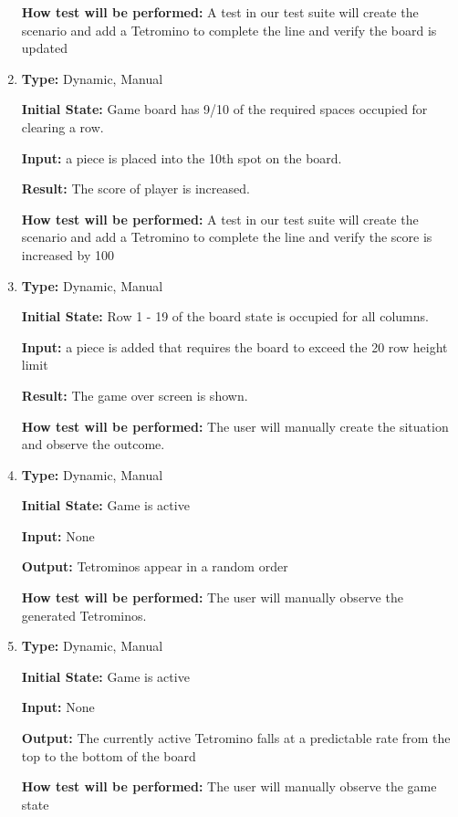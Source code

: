 \documentclass[12pt, titlepage]{article}
\begin{document}
\begin{enumerate}[{FR-BI-}1. ]
		\textbf{How test will be performed:} A test in our test suite will create the scenario and add a Tetromino to complete the line and verify the board is updated
		
		\item
		\textbf{Type:} Dynamic, Manual
		
		\textbf{Initial State:} Game board has 9/10 of the required spaces occupied for clearing a row.
		
		\textbf{Input:} a piece is placed into the 10th spot on the board.
		
		\textbf{Result:} The score of player is increased.
		
		\textbf{How test will be performed:} A test in our test suite will create the scenario and add a Tetromino to complete the line and verify the score is increased by 100
		
		
		\item
		\textbf{Type:} Dynamic, Manual
		
		\textbf{Initial State:} Row 1 - 19 of the board state is occupied for all columns.
		
		\textbf{Input:} a piece is added  that requires the board to exceed the 20 row height limit
		
		\textbf{Result:} The game over screen is shown.
		
		\textbf{How test will be performed:}  The user will manually create the situation and observe the outcome.
		
		\item
		\textbf{Type:} Dynamic, Manual
		
		\textbf{Initial State:} Game is active
		
		\textbf{Input:} None
		
		\textbf{Output:} Tetrominos appear in a random order
		
		\textbf{How test will be performed:} The user will manually observe the generated Tetrominos. 
		
		\item
		\textbf{Type:} Dynamic, Manual
		
		\textbf{Initial State:} Game is active
		
		\textbf{Input:} None
		
		\textbf{Output:} The currently active Tetromino falls at a predictable rate from the top to the bottom of the board
		
		\textbf{How test will be performed:} The user will manually observe the game state 
		

\end{enumerate}
\end{document}
